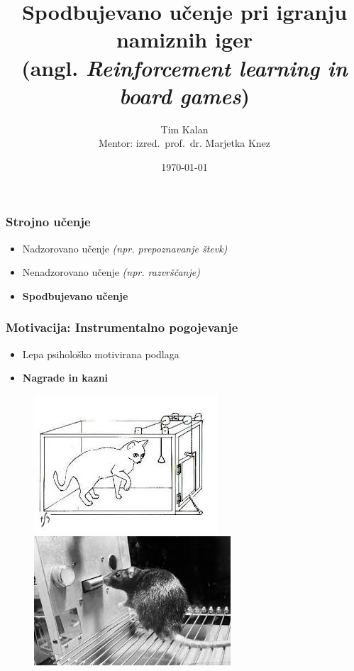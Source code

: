 \documentclass{beamer}    %
\author{Tim Kalan \\ \medskip
        \footnotesize Mentor: izred.~prof.~dr. Marjetka Knez}
\institute[FMF]{Fakulteta za matematiko in fiziko}
\title{
    Spodbujevano učenje pri igranju namiznih iger \\ 
    \large (angl. \textit{Reinforcement learning in board games})}
\date{\today}
\begin{document}
\begin{frame}
    \titlepage
\end{frame}


\begin{frame}
    \frametitle{Strojno učenje}
    \begin{itemize}
        \item Nadzorovano učenje \textit{(npr. prepoznavanje števk)}
        \item Nenadzorovano učenje \textit{(npr. razvrščanje)}
        \item \textbf{Spodbujevano učenje}
    \end{itemize}
\end{frame}


\begin{frame}
    \frametitle{Motivacija: Instrumentalno pogojevanje}
    \begin{itemize}
        \item Lepa psihološko motivirana podlaga
        \item \textbf{Nagrade in kazni} 
    \end{itemize}

    \begin{figure}[b]
        \includegraphics[scale=0.47]{slike/macka.jpg}
        \includegraphics[scale=0.5]{slike/miska.jpg}
    \end{figure}
\end{frame}
\end{document}
